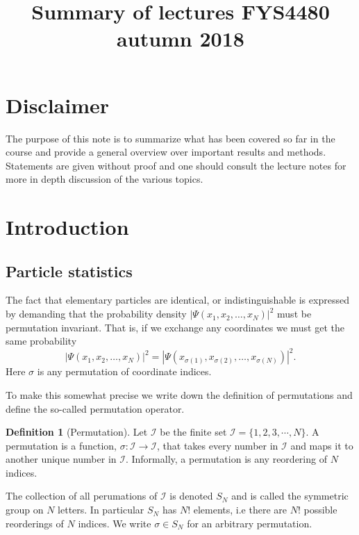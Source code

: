 \documentclass[a4paper,10pt]{article}
\title{Summary of lectures FYS4480 autumn 2018}
\theoremstyle{definition}
\newtheorem{definition}{Definition}
\begin{document}
\maketitle

\section*{Disclaimer}
The purpose of this note is to summarize what has been covered so far in the course and provide a general overview over 
important results and methods. Statements are given without proof and one should consult the lecture notes for more in depth 
discussion of the various topics.

\section{Introduction}

\subsection{Particle statistics}
The fact that elementary particles are identical, or indistinguishable is expressed by 
demanding that the probability density $|\Psi(x_1,x_2,\dots,x_N)|^2$ must be permutation invariant. That is, 
if we exchange any coordinates we must get the same probability
\begin{equation}
 |\Psi(x_1,x_2,\dots,x_N)|^2 = |\Psi(x_{\sigma(1)},x_{\sigma(2)},\dots,x_{\sigma(N)})|^2 .
\end{equation}
Here $\sigma$ is any permutation of coordinate indices. 

To make this somewhat precise we write down the definition
of permutations and define the so-called permutation operator.

\begin{definition}[Permutation]
 Let $\mathcal{I}$ be the finite set $\mathcal{I} = \{ 1,2,3,\cdots,N \}$. A 
 permutation is a function, $\sigma: \mathcal{I} \rightarrow \mathcal{I}$, that takes every number in 
 $\mathcal{I}$ and maps it to another unique number in $\mathcal{I}$. 
 Informally, a permutation is any reordering of $N$ indices.
 
 The collection of all perumations of $\mathcal{I}$ is denoted $S_N$ and is called the symmetric group on $N$ 
 letters. In particular $S_N$ has $N!$ elements, i.e there are $N!$ possible reorderings of $N$ indices. We write 
 $\sigma \in S_N$ for an arbitrary permutation.
\end{definition}
\end{document}

